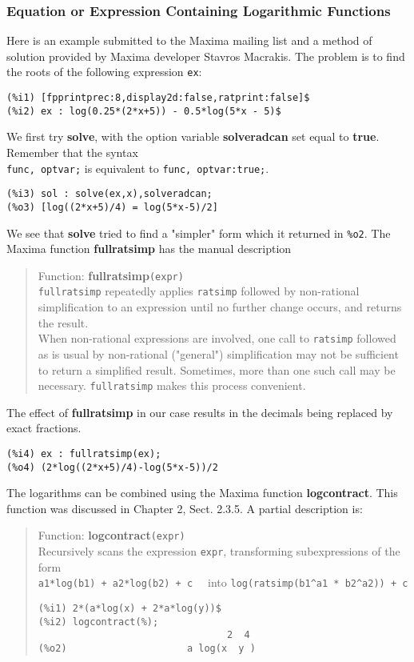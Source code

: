 \documentclass[12pt]{article}
\begin{document}
\subsubsection{Equation or Expression Containing Logarithmic Functions}
Here is an example submitted to the Maxima mailing list and a method of solution
  provided by Maxima developer Stavros Macrakis.
The problem is to find the roots of the following expression \verb|ex|:
\small
\begin{verbatim}
(%i1) [fpprintprec:8,display2d:false,ratprint:false]$
(%i2) ex : log(0.25*(2*x+5)) - 0.5*log(5*x - 5)$
\end{verbatim}
\normalsize
We first try \textbf{solve}, with the option variable \textbf{solveradcan} set
  equal to \textbf{true}.
Remember that the syntax\\
 \verb|func, optvar;| is equivalent to \verb|func, optvar:true;|.
\small
\begin{verbatim}
(%i3) sol : solve(ex,x),solveradcan;
(%o3) [log((2*x+5)/4) = log(5*x-5)/2]
\end{verbatim}
\normalsize
We see that \textbf{solve} tried to find a "simpler" form which it returned in \verb|%o2|.
The Maxima function \textbf{fullratsimp} has the manual description
\small
\begin{quote}
Function: \textbf{fullratsimp}\verb|(expr) |\\
\verb|fullratsimp| repeatedly applies \verb|ratsimp| followed by non-rational simplification
  to an expression until no further change occurs, and returns the result. \\
When non-rational expressions are involved, one call to \verb|ratsimp| followed as is
   usual by non-rational ("general") simplification may not be sufficient
   to return a simplified result.
Sometimes, more than one such call may be necessary.
\verb|fullratsimp| makes this process convenient. 
\end{quote}
\normalsize
The effect of \textbf{fullratsimp} in our case results in the decimals being replaced by exact
  fractions.
\small
\begin{verbatim}			
(%i4) ex : fullratsimp(ex);
(%o4) (2*log((2*x+5)/4)-log(5*x-5))/2
\end{verbatim}
\normalsize
The logarithms can be combined using the Maxima function \textbf{logcontract}.
This function was discussed in Chapter 2, Sect. 2.3.5.
A partial description is:
\small
\begin{quote}
Function: \textbf{logcontract}\verb|(expr) |\\
Recursively scans the expression \verb|expr|, transforming subexpressions
  of the form\\ \verb|a1*log(b1) + a2*log(b2) + c  | into \verb|log(ratsimp(b1^a1 * b2^a2)) + c | 
\begin{verbatim} 
(%i1) 2*(a*log(x) + 2*a*log(y))$
(%i2) logcontract(%);
                                 2  4
(%o2)                     a log(x  y )
\end{verbatim} 
\end{quote}
\end{document}
